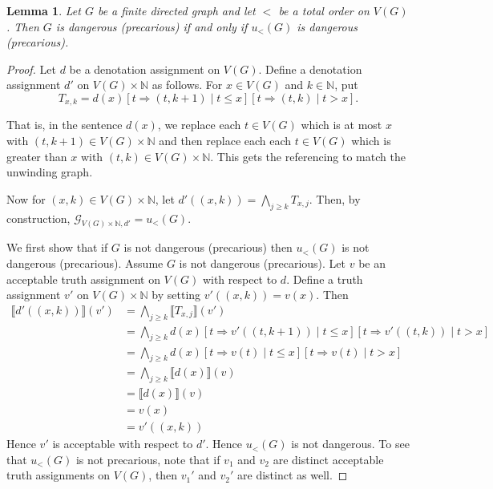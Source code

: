 \documentclass[12pt]{kluwer}
\newtheorem{lem}[thm]{Lemma}
\theoremstyle{remark}
\newcommand{\fancy}[1]{\mathcal{#1}}
\def\G{\fancy{G}}
\begin{document}
\begin{lem}\label{UnrollingPreservesDanger}
Let $G$ be a finite directed graph and let $<$ be a total order on $V(G)$.  Then $G$ is dangerous (precarious) if and only if $u_{<}(G)$ is dangerous (precarious).
\end{lem}
\begin{proof}
Let $d$ be a denotation assignment on $V(G)$.  Define a denotation assignment $d'$ on $V(G) \times \mathbb{N}$ as follows. For $x \in V(G)$ and $k \in \mathbb{N}$, put 
\[T_{x, k} = d(x)\left[t \Rightarrow (t, k + 1) \mid t \leq x\right]\left[t \Rightarrow (t, k) \mid t > x\right].\]

That is, in the sentence $d(x)$, we replace each $t \in V(G)$ which is at most $x$ with $(t, k + 1) \in V(G) \times \mathbb{N}$ and then replace each each $t \in V(G)$ which is greater than $x$ with $(t, k) \in V(G) \times \mathbb{N}$. This gets the referencing to match the unwinding graph.

Now for $(x, k) \in V(G) \times \mathbb{N}$, let $d'((x,k)) = \bigwedge_{j \geq k} T_{x, j}$. Then, by construction, $\G_{V(G) \times \mathbb{N}, d'} = u_{<}(G)$.

We first show that if $G$ is not dangerous (precarious) then $u_{<}(G)$ is not dangerous (precarious). Assume $G$ is not dangerous (precarious). Let $v$ be an acceptable truth assignment on $V(G)$ with respect to $d$.  Define a truth assignment $v'$ on $V(G) \times \mathbb{N}$ by setting $v'((x, k)) = v(x)$.  Then
\begin{align*}
\llbracket d'((x,k)) \rrbracket (v') &= \bigwedge_{j \geq k}  \llbracket T_{x, j} \rrbracket (v') \\
&=  \bigwedge_{j \geq k} d(x)\left[t \Rightarrow v'((t, k + 1)) \mid t \leq x \right]\left[t \Rightarrow v'((t, k))\mid t > x\right] \\
&=  \bigwedge_{j \geq k} d(x)\left[t \Rightarrow v(t) \mid t \leq x \right]\left[t \Rightarrow v(t)\mid t > x\right] \\
&= \bigwedge_{j \geq k} \llbracket d(x) \rrbracket(v) \\
&=  \llbracket d(x) \rrbracket(v) \\
&= v(x) \\
& = v'((x, k))
\end{align*}
Hence $v'$ is acceptable with respect to $d'$.   Hence $u_{<}(G)$ is not dangerous. To see that $u_{<}(G)$ is not precarious, note that if $v_1$ and $v_2$ are distinct acceptable truth assignments on $V(G)$, then $v_1'$ and $v_2'$ are distinct as well.


\end{proof}
\end{document}
